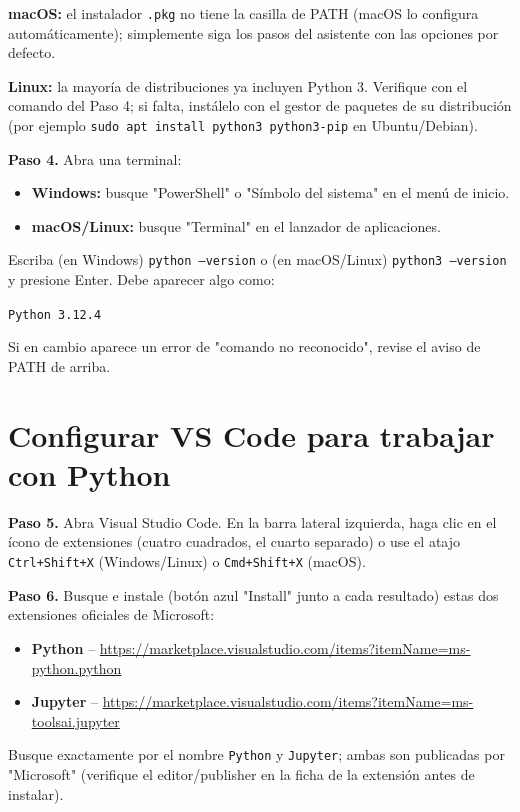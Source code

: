 \documentclass[11pt,a4paper]{article}
\newcommand{\code}[1]{\texttt{#1}}
\newcommand{\link}[1]{\url{#1}}
\begin{document}
\begin{stepbox}
\textbf{macOS:} el instalador \code{.pkg} no tiene la casilla de PATH (macOS lo configura automáticamente); simplemente siga los pasos del asistente con las opciones por defecto.

\textbf{Linux:} la mayoría de distribuciones ya incluyen Python 3. Verifique con el comando del Paso 4; si falta, instálelo con el gestor de paquetes de su distribución (por ejemplo \code{sudo apt install python3 python3-pip} en Ubuntu/Debian).
\end{stepbox}

\begin{verify}
\textbf{Paso 4.} Abra una terminal:
\begin{itemize}
  \item \textbf{Windows:} busque "PowerShell" o "Símbolo del sistema" en el menú de inicio.
  \item \textbf{macOS/Linux:} busque "Terminal" en el lanzador de aplicaciones.
\end{itemize}
Escriba (en Windows) \code{python --version} o (en macOS/Linux) \code{python3 --version} y presione Enter. Debe aparecer algo como:
\begin{center}\code{Python 3.12.4}\end{center}
Si en cambio aparece un error de "comando no reconocido", revise el aviso de PATH de arriba.
\end{verify}

\section{Configurar VS Code para trabajar con Python}

\begin{stepbox}
\textbf{Paso 5.} Abra Visual Studio Code. En la barra lateral izquierda, haga clic en el ícono de extensiones (cuatro cuadrados, el cuarto separado) o use el atajo \code{Ctrl+Shift+X} (Windows/Linux) o \code{Cmd+Shift+X} (macOS).
\end{stepbox}

\begin{stepbox}
\textbf{Paso 6.} Busque e instale (botón azul "Install" junto a cada resultado) estas dos extensiones oficiales de Microsoft:
\begin{itemize}
  \item \textbf{Python} -- \link{https://marketplace.visualstudio.com/items?itemName=ms-python.python}
  \item \textbf{Jupyter} -- \link{https://marketplace.visualstudio.com/items?itemName=ms-toolsai.jupyter}
\end{itemize}
Busque exactamente por el nombre \code{Python} y \code{Jupyter}; ambas son publicadas por "Microsoft" (verifique el editor/publisher en la ficha de la extensión antes de instalar).
\end{stepbox}
\end{document}
